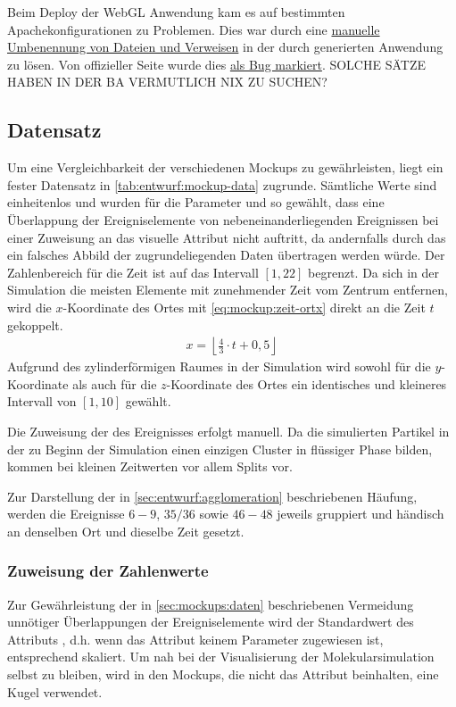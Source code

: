 Beim Deploy der  WebGL Anwendung kam es auf bestimmten Apachekonfigurationen zu Problemen. Dies war durch eine \href{http://forum.unity3d.com/threads/html-mem-causes-http-500-internal-server-error-on-apache.309762/}{manuelle Umbenennung von Dateien und Verweisen} in der durch  generierten Anwendung zu lösen. Von offizieller Seite wurde dies \href{http://forum.unity3d.com/threads/html-mem-causes-http-500-internal-server-error-on-apache.309762/#post-2014787}{als Bug markiert}. SOLCHE SÄTZE HABEN IN DER BA VERMUTLICH NIX ZU SUCHEN?

\subsection{Datensatz}\label{sec:mockups:daten}
Um eine Vergleichbarkeit der verschiedenen Mockups zu gewährleisten, liegt ein fester Datensatz in \autoref{tab:entwurf:mockup-data} zugrunde. Sämtliche Werte sind einheitenlos und wurden für die Parameter  und  so gewählt, dass eine Überlappung der Ereigniselemente von nebeneinanderliegenden Ereignissen bei einer Zuweisung an das visuelle Attribut  nicht auftritt, da andernfalls durch das  ein falsches Abbild der zugrundeliegenden Daten übertragen werden würde. Der Zahlenbereich für die Zeit ist auf das Intervall $[1,22]$ begrenzt. Da sich in der Simulation die meisten Elemente mit zunehmender Zeit vom Zentrum entfernen, wird die $x$-Koordinate des Ortes mit \autoref{eq:mockup:zeit-ortx} direkt an die Zeit $t$ gekoppelt.
\begin{align}\label{eq:mockup:zeit-ortx}
	x = \left\lfloor\frac 43\cdot t + 0,5\right\rfloor
\end{align}
Aufgrund des zylinderförmigen Raumes in der Simulation wird sowohl für die $y$-Koordinate als auch für die $z$-Koordinate des Ortes ein identisches und kleineres Intervall von $[1,10]$ gewählt.

Die Zuweisung der  des Ereignisses erfolgt manuell. Da die simulierten Partikel in der  zu Beginn der Simulation einen einzigen Cluster in flüssiger Phase bilden, kommen bei kleinen Zeitwerten vor allem Splits vor.

Zur Darstellung der in \autoref{sec:entwurf:agglomeration} beschriebenen Häufung, werden die Ereignisse $6-9$, $35/36$ sowie $46-48$ jeweils gruppiert und händisch an denselben Ort und dieselbe Zeit gesetzt.


\subsubsection{Zuweisung der Zahlenwerte}
Zur Gewährleistung der in \autoref{sec:mockups:daten} beschriebenen Vermeidung unnötiger Überlappungen der Ereigniselemente wird der Standardwert des Attributs , d.h. wenn das Attribut keinem Parameter zugewiesen ist, entsprechend skaliert. Um nah bei der Visualisierung der Molekularsimulation selbst zu bleiben, wird in den Mockups, die nicht das Attribut  beinhalten, eine Kugel verwendet. 

